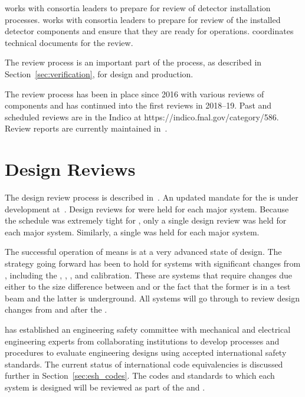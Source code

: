  works with consortia leaders to prepare for review of
detector installation processes.   works with consortia
leaders to prepare for review of the installed detector components and
ensure that they are ready for operations.   coordinates
technical documents for the   review.

The review process is an important part of the  
process, as described in Section~\ref{sec:verification}, for
design and production.

The review process has been in place since 2016 with various reviews
of  components and has continued into the first
 reviews in 2018--19. Past and scheduled reviews are in
the  Indico at https://indico.fnal.gov/category/586.
Review reports are currently maintained in~.

\section{Design Reviews}

The  design review process is described
in~. An updated mandate for the   is under
development at~\cite{bib:cernedms2173197}. %
Design reviews
for  were held for each major system. Because the
schedule was extremely tight for , only a single
design review was held for each major system. Similarly, a single
 was held for each major system.

The successful operation of  means  is at
a very advanced state of design. The strategy going forward has been
to hold  for systems with significant changes from
, including the , ,
, and calibration. These are systems that require changes
due either to the size difference between  and 
or the fact that the former is in a test beam and the latter is underground. All
systems will go through  to review design changes from
 and  after the .

 has established an engineering safety committee with
mechanical and electrical engineering experts from collaborating
institutions to develop processes and procedures to evaluate
engineering designs using accepted international safety standards. The
current status of international code equivalencies is discussed
further in Section~\ref{sec:esh_codes}. The codes and standards to
which each system is designed will be reviewed as part of the
 and .

